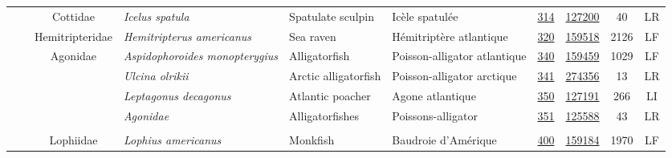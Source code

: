 \documentclass[12pt]{article}\usepackage[]{graphicx}\usepackage[]{color}
\begin{document}
\begin{landscape}
\begin{longtable}[t]{ccc>{\centering\arraybackslash}p{3cm}>{\centering\arraybackslash}p{3cm}>{\centering\arraybackslash}p{3cm}>{}c>{}ccc}
\nopagebreak
\hspace{1em}\hspace{1em} &  & Cottidae & \em{Icelus spatula} & Spatulate sculpin & Icèle spatulée & \href{#sec:314}{314} & \href{http://www.marinespecies.org/aphia.php?p=taxdetails&id=127200}{127200} & 40 & LR\\
\nopagebreak
\hspace{1em}\hspace{1em} &  & Hemitripteridae & \em{Hemitripterus americanus} & Sea raven & Hémitriptère atlantique & \href{#sec:320}{320} & \href{http://www.marinespecies.org/aphia.php?p=taxdetails&id=159518}{159518} & 2126 & LF\\
\nopagebreak
\hspace{1em}\hspace{1em} &  & Agonidae & \em{Aspidophoroides monopterygius} & Alligatorfish & Poisson-alligator atlantique & \href{#sec:340}{340} & \href{http://www.marinespecies.org/aphia.php?p=taxdetails&id=159459}{159459} & 1029 & LF\\
\nopagebreak
\hspace{1em}\hspace{1em} &  &  & \em{Ulcina olrikii} & Arctic alligatorfish & Poisson-alligator arctique & \href{#sec:341}{341} & \href{http://www.marinespecies.org/aphia.php?p=taxdetails&id=274356}{274356} & 13 & LR\\
\nopagebreak
\hspace{1em}\hspace{1em} &  &  & \em{Leptagonus decagonus} & Atlantic poacher & Agone atlantique & \href{#sec:350}{350} & \href{http://www.marinespecies.org/aphia.php?p=taxdetails&id=127191}{127191} & 266 & LI\\
\nopagebreak
\hspace{1em}\hspace{1em} &  &  & \em{Agonidae} & Alligatorfishes & Poissons-alligator & \href{#sec:351}{351} & \href{http://www.marinespecies.org/aphia.php?p=taxdetails&id=125588}{125588} & 43 & LR\\
\nopagebreak
\addlinespace[0.3em]
\\
\hspace{1em}\hspace{1em} &  & Lophiidae & \em{Lophius americanus} & Monkfish & Baudroie d'Amérique & \href{#sec:400}{400} & \href{http://www.marinespecies.org/aphia.php?p=taxdetails&id=159184}{159184} & 1970 & LF\\

\end{longtable}
\end{landscape}
\end{document}
